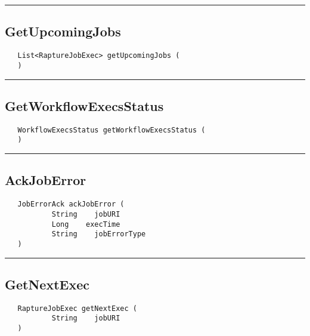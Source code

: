 \rule{15cm}{2pt}
\subsection{GetUpcomingJobs}
\label{Api:GetUpcomingJobs}
\begin{verbatim}
   List<RaptureJobExec> getUpcomingJobs (
   )
\end{verbatim}



\rule{15cm}{2pt}
\subsection{GetWorkflowExecsStatus}
\label{Api:GetWorkflowExecsStatus}
\begin{verbatim}
   WorkflowExecsStatus getWorkflowExecsStatus (
   )
\end{verbatim}



\rule{15cm}{2pt}
\subsection{AckJobError}
\label{Api:AckJobError}
\begin{verbatim}
   JobErrorAck ackJobError (
           String    jobURI
           Long    execTime
           String    jobErrorType
   )
\end{verbatim}



\rule{15cm}{2pt}
\subsection{GetNextExec}
\label{Api:GetNextExec}
\begin{verbatim}
   RaptureJobExec getNextExec (
           String    jobURI
   )
\end{verbatim}



